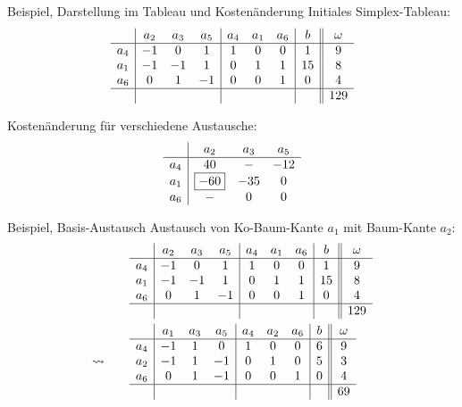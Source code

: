 \documentclass[accentcolor = tud11b, colorbacktitle, landscape, german, presentation, tudmathserif]{tudbeamer}
\begin{document}
			\begin{frame}{Beispiel, Darstellung im Tableau und Kostenänderung}
				Initiales Simplex-Tableau:
				\begin{equation*}
					\begin{array}{c|ccc|ccc|c||c}
						    & a_2 & a_3 & a_5 & a_4 & a_1 & a_6 & b  & \omega \\ \hline
						a_4 & -1  &  0  &  1  &  1  &  0  &  0  & 1  &   9    \\
						a_1 & -1  & -1  &  1  &  0  &  1  &  1  & 15 &   8    \\
						a_6 &  0  &  1  & -1  &  0  &  0  &  1  & 0  &   4    \\ \hline
						    &     &     &     &     &     &     &    &  129
					\end{array}
				\end{equation*}
				
				Kostenänderung für verschiedene Austausche:
				\begin{equation*}
					\begin{array}{c|ccc}
						    &        a_2         & a_3 & a_5 \\ \hline
						a_4 &         40         &  -  & -12 \\
						a_1 & \framebox{\(-60\)} & -35 &  0  \\
						a_6 &         -          &  0  &  0
					\end{array}
				\end{equation*}
			\end{frame}
		
			\begin{frame}{Beispiel, Basis-Austausch}
				Austausch von Ko-Baum-Kante \( a_1 \) mit Baum-Kante \( a_2 \):
				\begin{align*}
					&\begin{array}{c|ccc|ccc|c||c}
						    & a_2 & a_3 & a_5 & a_4 & a_1 & a_6 & b  & \omega \\ \hline
						a_4 & -1  &  0  &  1  &  1  &  0  &  0  & 1  &   9    \\
						a_1 & -1  & -1  &  1  &  0  &  1  &  1  & 15 &   8    \\
						a_6 &  0  &  1  & -1  &  0  &  0  &  1  & 0  &   4    \\ \hline
						    &     &     &     &     &     &     &    &  129
					\end{array} \\
					\leadsto\quad\quad&
					\begin{array}{c|ccc|ccc|c||c}
						    & a_1 & a_3 & a_5 & a_4 & a_2 & a_6 & b & \omega \\ \hline
						a_4 & -1  &  1  &  0  &  1  &  0  &  0  & 6 &   9    \\
						a_2 & -1  &  1  & -1  &  0  &  1  &  0  & 5 &   3    \\
						a_6 &  0  &  1  & -1  &  0  &  0  &  1  & 0 &   4    \\ \hline
						    &     &     &     &     &     &     &   &   69
					\end{array}
				\end{align*}
			\end{frame}
		
\end{document}
